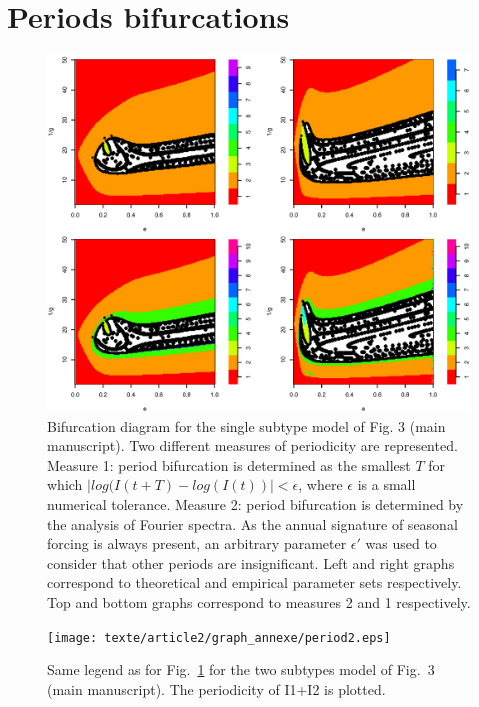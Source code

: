 \clearpage

\section{Periods bifurcations}

\begin{figure}[htb]
  \center
    \includegraphics[width= 0.8 \linewidth]{texte/article2/graph_annexe/period1.eps}
    \caption{Bifurcation diagram for the single subtype model of
      Fig. 3 (main manuscript). Two different measures of periodicity are
      represented. Measure 1: period bifurcation is determined as the
      smallest $T$ for which $|log(I(t+T)-log(I(t))|< \epsilon$, where
      $\epsilon$ is a small numerical tolerance. Measure 2: period bifurcation is
      determined by the analysis of Fourier spectra. As the annual
      signature of seasonal forcing is always present, an arbitrary
      parameter $\epsilon'$ was used to consider that other periods are
      insignificant. Left and right graphs correspond to
      theoretical and empirical parameter sets respectively. Top and bottom graphs
       correspond to measures 2 and 1 respectively.}
  \label{fig:period1}
\end{figure}

\begin{figure}[htb]
  \center
    \texttt{[image: texte/article2/graph\_annexe/period2.eps]}
    \caption{Same legend as for Fig.~\ref{fig:period1} for the two
      subtypes model of Fig.~3 (main manuscript). The periodicity of
      I1+I2 is plotted.}
  \label{fig:period2}
\end{figure}


